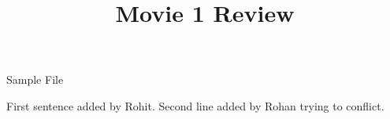 \documentclass{article}
\begin{document}
\title{Movie 1 Review}


\centerline{\sc \large Sample File}
\vspace{.5pc}
\centerline{\sc }
\vspace{2pc}

First sentence added by Rohit.
Second line added by Rohan trying to conflict.
\end{document}
